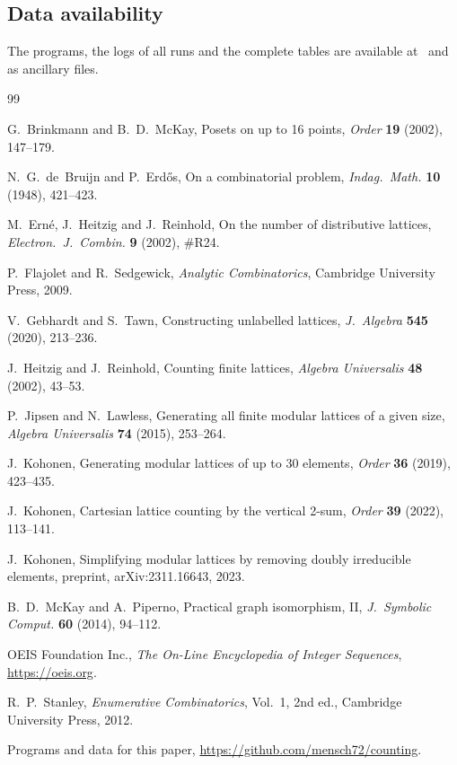 \documentclass[11pt]{amsart}
\theoremstyle{definition}
\theoremstyle{remark}
\begin{document}
\subsection*{Data availability}
The programs, the logs of all runs and the complete tables are available at~\cite{code}
and as ancillary files.

\begin{thebibliography}{99}

 G.~Brinkmann and B.~D.~McKay, Posets on up to 16 points,
  \emph{Order} \textbf{19} (2002), 147--179.

 N.~G.~de~Bruijn and P.~Erd\H{o}s, On a combinatorial problem,
  \emph{Indag.\ Math.} \textbf{10} (1948), 421--423.

 M.~Ern\'e, J.~Heitzig and J.~Reinhold, On the number of distributive
  lattices, \emph{Electron.\ J.\ Combin.} \textbf{9} (2002), \#R24.

 P.~Flajolet and R.~Sedgewick, \emph{Analytic Combinatorics}, Cambridge
  University Press, 2009.

 V.~Gebhardt and S.~Tawn, Constructing unlabelled lattices,
  \emph{J.\ Algebra} \textbf{545} (2020), 213--236.

 J.~Heitzig and J.~Reinhold, Counting finite lattices,
  \emph{Algebra Universalis} \textbf{48} (2002), 43--53.

 P.~Jipsen and N.~Lawless, Generating all finite modular lattices of a
  given size, \emph{Algebra Universalis} \textbf{74} (2015), 253--264.

 J.~Kohonen, Generating modular lattices of up to 30 elements,
  \emph{Order} \textbf{36} (2019), 423--435.

 J.~Kohonen, Cartesian lattice counting by the vertical 2-sum,
  \emph{Order} \textbf{39} (2022), 113--141.

 J.~Kohonen, Simplifying modular lattices by removing doubly irreducible
  elements, preprint, arXiv:2311.16643, 2023.

 B.~D.~McKay and A.~Piperno, Practical graph isomorphism, II,
  \emph{J.\ Symbolic Comput.} \textbf{60} (2014), 94--112.

 OEIS Foundation Inc., \emph{The On-Line Encyclopedia of Integer
  Sequences}, \url{https://oeis.org}.

 R.~P.~Stanley, \emph{Enumerative Combinatorics}, Vol.~1, 2nd ed.,
  Cambridge University Press, 2012.

 Programs and data for this paper,
  \url{https://github.com/mensch72/counting}.

\end{thebibliography}
\end{document}
